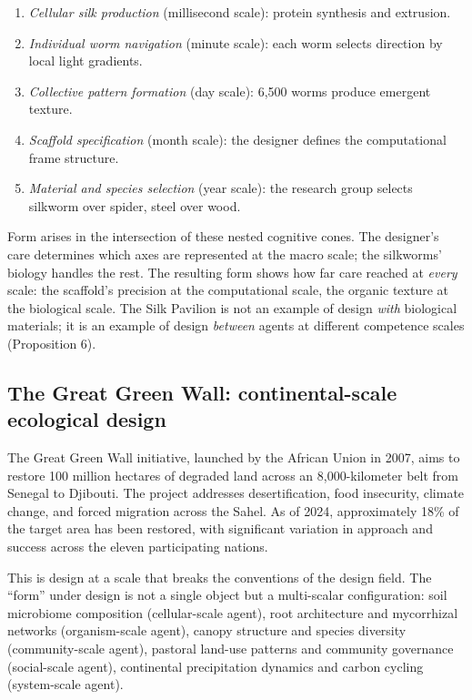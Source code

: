 \begin{enumerate}
\item \textit{Cellular silk production} (millisecond scale): protein synthesis and extrusion.
\item \textit{Individual worm navigation} (minute scale): each worm selects direction by local light gradients.
\item \textit{Collective pattern formation} (day scale): 6,500 worms produce emergent texture.
\item \textit{Scaffold specification} (month scale): the designer defines the computational frame structure.
\item \textit{Material and species selection} (year scale): the research group selects silkworm over spider, steel over wood.
\end{enumerate}

\noindent Form arises in the intersection of these nested cognitive cones. The designer's care determines which axes are represented at the macro scale; the silkworms' biology handles the rest. The resulting form shows how far care reached at \textit{every} scale: the scaffold's precision at the computational scale, the organic texture at the biological scale. The Silk Pavilion is not an example of design \textit{with} biological materials; it is an example of design \textit{between} agents at different competence scales (Proposition 6).

\subsection{The Great Green Wall: continental-scale ecological design}

The Great Green Wall initiative, launched by the African Union in 2007, aims to restore 100 million hectares of degraded land across an 8,000-kilometer belt from Senegal to Djibouti. The project addresses desertification, food insecurity, climate change, and forced migration across the Sahel. As of 2024, approximately 18\% of the target area has been restored, with significant variation in approach and success across the eleven participating nations.

This is design at a scale that breaks the conventions of the design field. The ``form'' under design is not a single object but a multi-scalar configuration: soil microbiome composition (cellular-scale agent), root architecture and mycorrhizal networks (organism-scale agent), canopy structure and species diversity (community-scale agent), pastoral land-use patterns and community governance (social-scale agent), continental precipitation dynamics and carbon cycling (system-scale agent).

